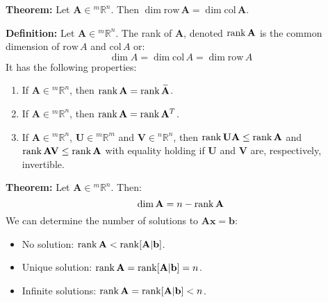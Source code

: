\documentclass{article}
\newcommand{\bff}[1]{\mathbf{#1}}
\newcommand{\col}[1]{\mathrm{col}\,#1}
\newcommand{\row}[1]{\mathrm{row}\,#1}
\newcommand{\red}[1]{\widetilde{#1}}
\begin{document}
\begin{minipage}[t]{.45\textwidth}
        \textbf{Theorem:} Let $\bff{A} \in {^m}\mathbb{R}^n$. Then $\dim \row \bff{A} = \dim \col \bff{A}$.
        \vspace{-2mm} %
        
        \textbf{Definition:} Let $\bff{A} \in {^m}\mathbb{R}^n$. The rank of $\bff{A}$, denoted $\rank \bff{A}$ is the common dimension of $\row A$ and $\col A$ or:
        \begin{equation*}
            \dim A = \dim \col A = \dim \row A
        \end{equation*}
        It has the following properties:
        \vspace{1mm}
        \begin{enumerate}[label=\textbf{Property \Roman*}, leftmargin=18mm]
            \item If $\bff{A} \in {^m}\mathbb{R}^n$, then $\rank \bff{A} = \rank \red{\bff{A}}$.
            \item If $\bff{A} \in {^m}\mathbb{R}^n$, then $\rank \bff{A} = \rank \bff{A}^T$.
            \item If $\bff{A} \in {^m}\mathbb{R}^n$, $\bff{U} \in {^m}\mathbb{R}^m$ and $\bff{V} \in {^n}\mathbb{R}^n$, then $\rank \bff{UA} \le \rank \bff{A}$ and $\rank \bff{AV} \le \rank \bff{A}$ with equality holding if $\bff{U}$ and $\bff{V}$ are, respectively, invertible.
        \end{enumerate}
        \vspace{2mm}

        \textbf{Theorem:} Let $\bff{A} \in {^m}\mathbb{R}^n$. Then:
        \begin{equation*}
            \dim \null \bff{A} = n - \rank \bff{A}
        \end{equation*}
        We can determine the number of solutions to $\bff{Ax}=\bff{b}$:
        \begin{itemize}
            \item No solution: $\rank\bff{A} < \rank[\bff{A}|\bff{b}]$.
            \item Unique solution: $\rank \bff{A} = \rank[\bff{A}|\bff{b}] = n$.
            \item Infinite solutions: $\rank \bff{A} = \rank[\bff{A}|\bff{b}]<n$.
        \end{itemize}
    \end{minipage} %
    \hfill
\end{document}
